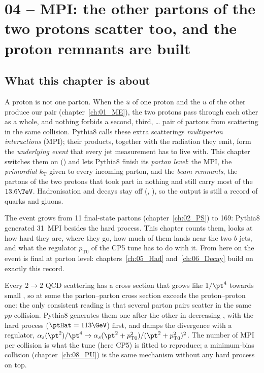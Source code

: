 \chapter{04 -- MPI: the other partons of the two protons scatter too, and the proton remnants are built}
\label{ch:04_MPI}
\providecommand{\ptz}{\ensuremath{p_{\mathrm{T}0}}}  %

\section{What this chapter is about}

A proton is not one parton. When the $\bar u$ of one proton and the $u$ of the other produce our \bbbar{} pair
(chapter~\ref{ch:01_ME}), the two protons pass through each other as a whole, and nothing forbids a second,
third, \dots{} pair of partons from scattering in the same collision. Pythia8 calls these extra scatterings
\emph{multiparton interactions} (MPI); their products, together with the radiation they emit, form the
\emph{underlying event} that every jet measurement has to live with. This chapter switches them on
() and lets Pythia8 finish its \emph{parton level}: the MPI, the \emph{primordial
$k_\mathrm{T}$} given to every incoming parton, and the \emph{beam remnants}, the partons of the two protons that
took part in nothing and still carry most of the $13.6\TeV$. Hadronisation and decays stay off
(, ), so the output is still a record of quarks and
gluons.

The event grows from 11 final-state partons (chapter~\ref{ch:02_PS}) to 169: Pythia8 generated 31~MPI besides
the hard process. This chapter counts them, looks at how hard they are, where they go, how much of them lands near
the two $b$ jets, and what the regulator $\ptz$ of the CP5 tune has to do with it. From here on the event is
final at parton level: chapters~\ref{ch:05_Had} and~\ref{ch:06_Decay} build on exactly this record.

\begin{plainwords}
Every $2\to2$ QCD scattering has a cross section that grows like $1/\pt^4$ towards small \pt, so at some
\pt{} the parton--parton cross section exceeds the proton--proton one: the only consistent reading is that
several parton pairs scatter in the same $pp$ collision. Pythia8 generates them one after the other in
decreasing \pt, with the hard process ($\ptHat = 113\GeV$) first, and damps the divergence with a regulator,
$\alpha_s(\pt^2)/\pt^4 \to \alpha_s(\pt^2+\ptz^2)/(\pt^2+\ptz^2)^2$. The number of MPI per collision is
what the tune (here CP5) is fitted to reproduce; a minimum-bias collision (chapter~\ref{ch:08_PU}) is the same
mechanism without any hard process on top.
\end{plainwords}

